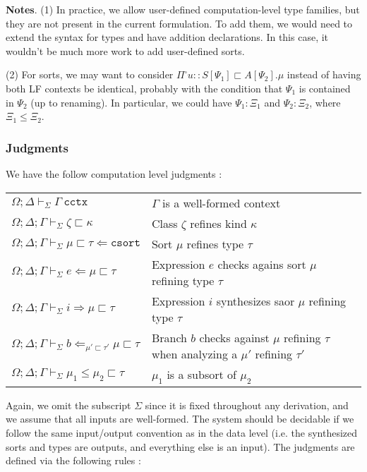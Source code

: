 \documentclass[letterpaper, 11pt]{article}
\newcommand{\Rar}{\Rightarrow}
\newcommand{\Lar}{\Leftarrow}
\newcommand{\csort}{\texttt{csort}}
\newcommand{\cctx}{\texttt{cctx}}
\begin{document}
    \textbf{Notes}. (1) In practice, we allow user-defined computation-level type families, but they are not present in the current formulation.  To add
    them, we would need to extend the syntax for types and have addition declarations.  In this case, it wouldn't be much more work to add user-defined
    sorts.

    (2) For sorts, we may want to consider $\Pi^\square u{::}S[\Psi_1] \sqsubset A[\Psi_2]. \mu$ instead of having both LF contexts be identical, probably
    with the condition that $\Psi_1$ is contained in $\Psi_2$ (up to renaming).  In particular, we could have $\Psi_1 {:} \Xi_1$ and $\Psi_2 {:} \Xi_2$,
    where $\Xi_1 \leq \Xi_2$.

    \subsubsection{Judgments}
    We have the follow computation level judgments :

    \begin{tabular}{ll}
      $\Omega; \Delta \vdash_\Sigma \Gamma \ \cctx$                                         & $\Gamma$ is a well-formed context \\
      $\Omega; \Delta; \Gamma \vdash_\Sigma \zeta \sqsubset \kappa$                       & Class $\zeta$ refines kind $\kappa$ \\
      $\Omega; \Delta; \Gamma \vdash_\Sigma \mu \sqsubset \tau \Lar \csort$               & Sort $\mu$ refines type $\tau$ \\
      $\Omega; \Delta; \Gamma \vdash_\Sigma e \Lar \mu \sqsubset \tau$                    & Expression $e$ checks agains sort $\mu$ refining type $\tau$ \\
      $\Omega; \Delta; \Gamma \vdash_\Sigma i \Rar \mu \sqsubset \tau$                    & Expression $i$ synthesizes saor $\mu$ refining type $\tau$ \\
      $\Omega; \Delta; \Gamma \vdash_\Sigma b \Lar_{\mu' \sqsubset \tau'} \mu \sqsubset \tau$ & Branch $b$ checks against $\mu$ refining $\tau$ 
                                                                                           when analyzing a $\mu'$ refining $\tau'$ \\
      $\Omega; \Delta; \Gamma \vdash_\Sigma \mu_1 \leq \mu_2 \sqsubset \tau$              & $\mu_1$ is a subsort of $\mu_2$ 
    \end{tabular}

    Again, we omit the subscript $\Sigma$ since it is fixed throughout any derivation, and we assume that all inputs are well-formed.  The system should
    be decidable if we follow the same input/output convention as in the data level (i.e. the synthesized sorts and types are outputs, and everything else
    is an input).  The judgments are defined via the following rules :
\end{document}
